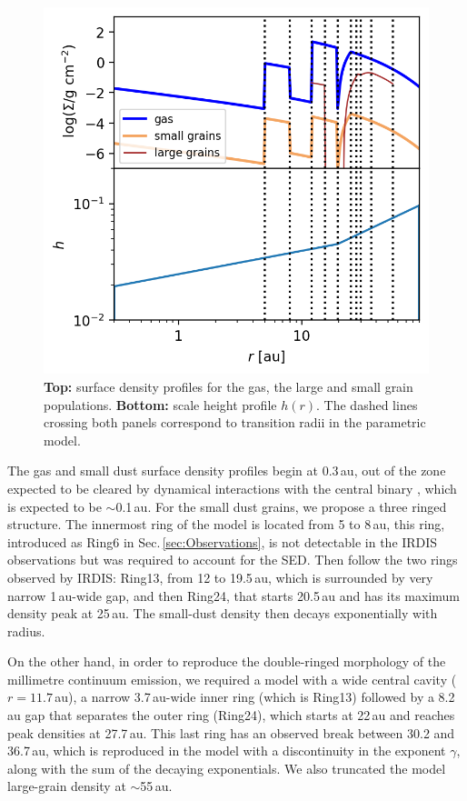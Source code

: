 \documentclass[letters,usenatbib,times]{mnras}
\begin{document}
\begin{figure}
	\includegraphics[width=\columnwidth]{allprofiles.png}
        \caption{{\bf Top:} surface density profiles for the gas, the large and small grain populations. {\bf Bottom:} scale height profile $h(r)$. The dashed lines crossing both panels correspond to transition radii in the parametric model.}
    \label{fig:profiles}
\end{figure}

The gas and small dust surface density profiles begin at 0.3\,au, out of the zone expected to be cleared by dynamical interactions with the central binary \citep{Art_Lu}, which is expected to be $\sim$0.1\,au. For the small dust grains, we propose a three ringed structure. The innermost ring of the model is located from 5 to 8\,au, this ring, introduced as Ring6 in Sec.\,\ref{sec:Observations}, is not detectable in the IRDIS observations but was required to account for the SED. Then follow the two rings observed by IRDIS: Ring13, from 12 to 19.5\,au, which is surrounded by very narrow 1\,au-wide gap, and then Ring24, that starts 20.5\,au and has its maximum density peak at 25\,au. The small-dust density then decays exponentially with radius.

On the other hand, in order to reproduce the double-ringed morphology of the millimetre continuum emission, we required a model with a wide central cavity ($r = 11.7$\,au), a narrow 3.7\,au-wide inner ring (which is Ring13) followed by a 8.2\,au gap that separates the outer ring (Ring24), which starts at 22\,au and reaches peak densities at 27.7\,au. This last ring has an observed break between 30.2 and 36.7\,au, which is reproduced in the model with a discontinuity in the exponent $\gamma$, along with the sum of the decaying exponentials. We also truncated the model large-grain density at $\sim$55\,au. 
\end{document}
